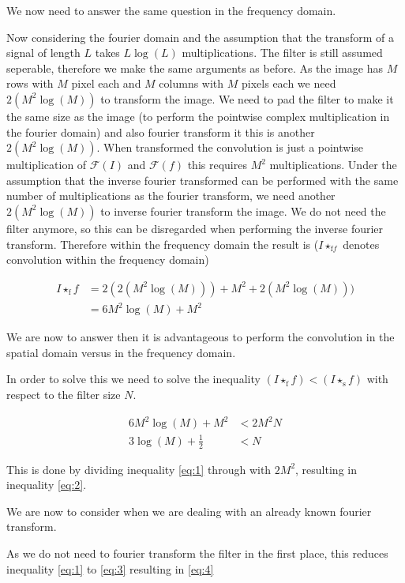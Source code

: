 \documentclass[a4paper, 10pt, final]{article}
\begin{document}
We now need to answer the same question in the frequency domain.

Now considering the fourier domain and the assumption that the
transform of a signal of length $L$ takes $L \log{(L)}$
multiplications. The filter is still assumed seperable, therefore we
make the same arguments as before. As the image has $M$ rows with $M$
pixel each and $M$ columns with $M$ pixels each we need $2(M^{2}
\log{(M)})$ to transform the image. We need to pad the filter to make
it the same size as the image (to perform the pointwise complex
multiplication in the fourier domain) and also fourier transform it
this is another $2(M^{2} \log{(M)})$. When transformed the convolution
is just a pointwise multiplication of $\mathcal{F}(I)$ and
$\mathcal{F}(f)$ this requires $M^{2}$ multiplications. Under the
assumption that the inverse fourier transformed can be performed with
the same number of multiplications as the fourier transform, we need
another $2(M^{2} \log{(M)})$ to inverse fourier transform the
image. We do not need the filter anymore, so this can be disregarded
when performing the inverse fourier transform. Therefore within the
frequency domain the result is ($I \star_{\textrm{f} f}$ denotes
convolution within the frequency domain)

\begin{align*}
  I \star_{\textrm{f}} f & = 2(2(M^{2}\log{(M)})) + M^{2} + 2(M^{2}\log{(M)})) \\
  & = 6M^{2}\log{(M)} + M^{2}
\end{align*}

We are now to answer then it is advantageous to perform the
convolution in the spatial domain versus in the frequency domain.

In order to solve this we need to solve the inequality $(I
\star_{\textrm{f}} f) < (I \star_{\textrm{s}} f)$ with respect to the
filter size $N$.

\begin{align}
  \label{eq:1}6M^{2}\log{(M)} + M^{2} & < 2M^{2}N \\
  \label{eq:2} 3 \log{(M)} + \frac{1}{2} & < N
\end{align}

This is done by dividing inequality \ref{eq:1} through with $2M^{2}$,
resulting in inequality \ref{eq:2}.

We are now to consider when we are dealing with an already known
fourier transform.

As we do not need to fourier transform the filter in the first place,
this reduces inequality \ref{eq:1} to \ref{eq:3} resulting in
\ref{eq:4}
\end{document}
